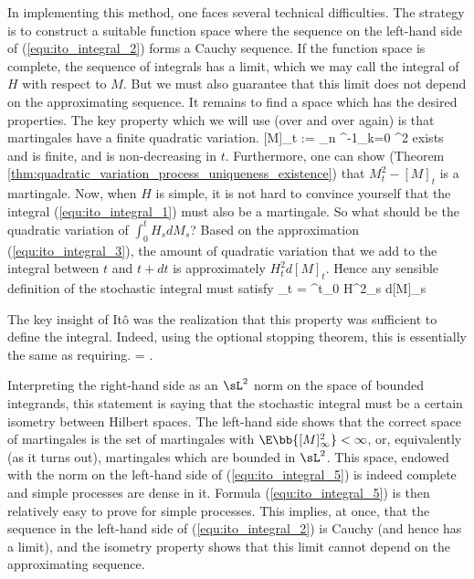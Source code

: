 In implementing this method, one faces several technical difficulties. The strategy is to construct a suitable function space where the sequence on the left-hand side of (\ref{equ:ito_integral_2}) forms a Cauchy sequence. If the function space is complete, the sequence of integrals has a limit, which we may call the integral of $H$ with respect to $M$. But we must also guarantee that this limit does not depend on the approximating sequence. It remains to find a space which has the desired properties. The key property which we will use (over and over again) is that martingales have a finite quadratic variation.
\be\label{equ:ito_integral_3}
[M]_t := \lim_{n\to \infty} \sum^{-1}_{k=0} ^2
\ee
exists and is finite, and is non-decreasing in $t$. Furthermore, one can show (Theorem \ref{thm:quadratic_variation_process_uniqueness_existence}) that $M^2_t - [M]_t$ is a martingale. Now, when $H$ is simple, it is not hard to convince yourself that the integral (\ref{equ:ito_integral_1}) must also be a martingale. So what should be the quadratic variation of $\int^t_0 H_sdM_s$? Based on the approximation (\ref{equ:ito_integral_3}), the amount of quadratic variation that we add to the integral between $t$ and $t+dt$ is approximately $H^2_t d[M]_t$. Hence any sensible definition of the stochastic integral must satisfy
\be\label{equ:ito_integral_4}
_t = \int^t_0 H^2_s d[M]_s 
\ee

The key insight of It\^o was the realization that this property was sufficient to define the integral. Indeed, using the optional stopping theorem, this is essentially the same as requiring. 
\be\label{equ:ito_integral_5}
\E{} = \E{}.
\ee

Interpreting the right-hand side as an $\sL^2$ norm on the space of bounded integrands, this statement is saying that the stochastic integral must be a certain isometry between Hilbert spaces. The left-hand side shows that the correct space of martingales is the set of martingales with $\E\bb{[M]^2_\infty} < \infty$, or, equivalently (as it turns out), martingales which are bounded in $\sL^2$. This space, endowed with the norm on the left-hand side of (\ref{equ:ito_integral_5}) is indeed complete and simple processes are dense in it. Formula (\ref{equ:ito_integral_5}) is then relatively easy to prove for simple processes. This implies, at once, that the sequence in the left-hand side of (\ref{equ:ito_integral_2}) is Cauchy (and hence has a limit), and the isometry property shows that this limit cannot depend on the approximating sequence.

